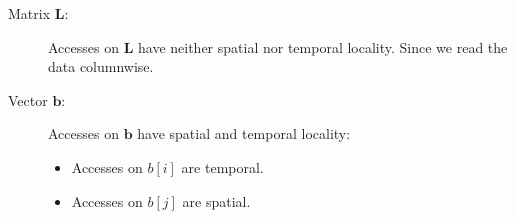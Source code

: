 \documentclass[portrait,a4paper]{article}
\begin{document}
\begin{description}\label{bla}
    \item[Matrix $\mathbf{L}$:] Accesses on $\mathbf{L}$ have neither spatial nor temporal locality. Since we read the data columnwise.
    \item[Vector $\mathbf{b}$:] Accesses on $\mathbf{b}$ have spatial and temporal locality:
        \begin{itemize}
            \item Accesses on $b[i]$ are temporal.
            \item Accesses on $b[j]$ are spatial.
        \end{itemize}
\end{description}
\end{document}
